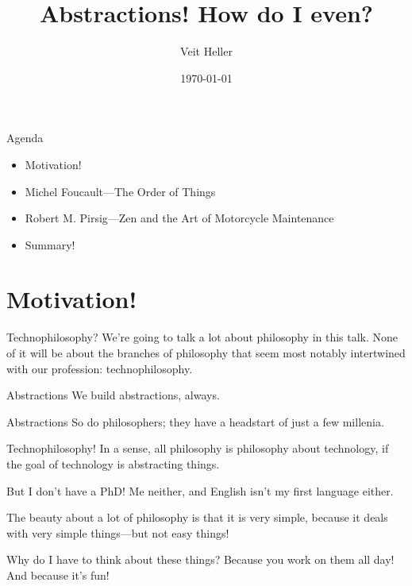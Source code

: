 \documentclass[aspectratio=169]{beamer}
\title{Abstractions! How do I even?}
\date{\today}
\author{Veit Heller}
\institute{EnthusiastiCon 2019}
\begin{document}
  \maketitle
  \begin{frame}{Agenda}
    \begin{itemize}
      \item Motivation!
      \item Michel Foucault—The Order of Things
      \item Robert M. Pirsig—Zen and the Art of Motorcycle Maintenance
      \item Summary!
    \end{itemize}
  \end{frame}
  \section{Motivation!}
  \begin{frame}{Technophilosophy?}
    We’re going to talk a lot about philosophy in this talk. None of it will be
    about the branches of philosophy that seem most notably intertwined with
    our profession: technophilosophy.
  \end{frame}
  \begin{frame}{Abstractions}
    We build abstractions, always.
  \end{frame}
  \begin{frame}{Abstractions}
    So do philosophers; they have a headstart of just a few millenia.
  \end{frame}
  \begin{frame}{Technophilosophy!}
    In a sense, all philosophy is philosophy about technology, if the goal of
    technology is abstracting things.
  \end{frame}
  \begin{frame}{But I don’t have a PhD!}
    Me neither, and English isn’t my first language either.

    The beauty about a lot of philosophy is that it is very simple, because it
    deals with very simple things—but not easy things!
  \end{frame}
  \begin{frame}{Why do I have to think about these things?}
    Because you work on them all day! And because it’s fun!
  \end{frame}
\end{document}
